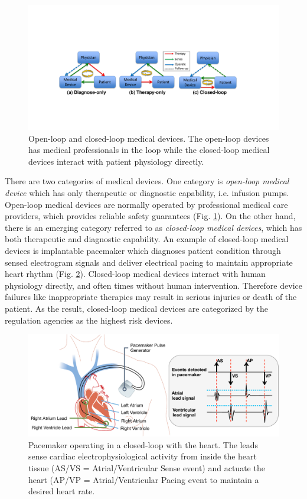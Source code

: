 \documentclass[a4paper]{article}
\begin{document}
\begin{figure}[b]
	\centering
	\includegraphics[scale=0.35]{figs/closed-loop.pdf}
	\caption{\small Open-loop and closed-loop medical devices. The open-loop devices has medical professionals in the loop while the closed-loop medical devices interact with patient physiology directly.}
	\label{fig:closed-loop}
\end{figure}

There are two categories of medical devices. 
One category is \emph{open-loop medical device} which has only therapeutic or diagnostic capability, i.e. infusion pumps. 
Open-loop medical devices are normally operated by professional medical care providers, which provides reliable safety guarantees (Fig. \ref{fig:closed-loop}).
On the other hand, there is an emerging category referred to as \emph{closed-loop medical devices}, which has both therapeutic and diagnostic capability.
An example of closed-loop medical devices is implantable pacemaker which diagnoses patient condition through sensed electrogram signals and deliver electrical pacing to maintain appropriate heart rhythm (Fig. \ref{fig:pacemaker}). 
Closed-loop medical devices interact with human physiology directly, and often times without human intervention.
Therefore device failures like inappropriate therapies may result in serious injuries or death of the patient.
As the result, closed-loop medical devices are categorized by the regulation agencies as the highest risk devices.
\begin{figure}[t]
	\centering
	\includegraphics[scale=0.35]{figs/fig1pacemaker.pdf}
	\caption{\small Pacemaker operating in a closed-loop with the heart. The leads sense cardiac electrophysiological activity from inside the heart tissue (AS/VS = Atrial/Ventricular Sense event) and actuate the heart (AP/VP = Atrial/Ventricular Pacing event to maintain a desired heart rate.}
	\label{fig:pacemaker}
\end{figure}
\end{document}
